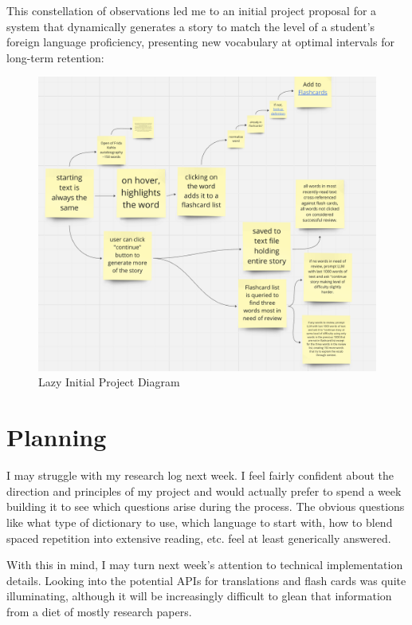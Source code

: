 \documentclass[
	letterpaper, %
]{jdf}
\begin{document}
This constellation of observations led me to an initial project proposal for a system that dynamically generates a story to match the level of a student's foreign language proficiency, presenting new vocabulary at optimal intervals for long-term retention:
\begin{figure}
    \centering
    \includegraphics[width=0.5\linewidth]{Assignments//Assignment 2/design_sketch.png}
    \caption{Lazy Initial Project Diagram}
    \label{fig:enter-label}
\end{figure}

\section{Planning}
I may struggle with my research log next week. I feel fairly confident about the direction and principles of my project and would actually prefer to spend a week building it to see which questions arise during the process. The obvious questions like what type of dictionary to use, which language to start with, how to blend spaced repetition into extensive reading, etc. feel at least generically answered. 

With this in mind, I may turn next week's attention to technical implementation details. Looking into the potential APIs for translations and flash cards was quite illuminating, although it will be increasingly difficult to glean that information from a diet of mostly research papers.

\printbibliography{}
\end{document}
